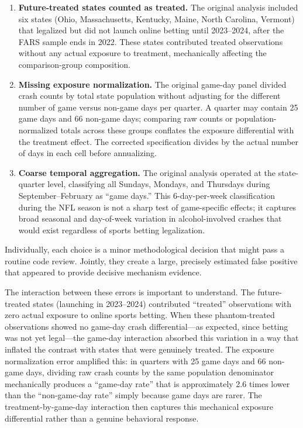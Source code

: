 \documentclass[12pt]{article}
\begin{document}
\begin{enumerate}
\item \textbf{Future-treated states counted as treated.} The original analysis included six states (Ohio, Massachusetts, Kentucky, Maine, North Carolina, Vermont) that legalized but did not launch online betting until 2023--2024, after the FARS sample ends in 2022. These states contributed treated observations without any actual exposure to treatment, mechanically affecting the comparison-group composition.

\item \textbf{Missing exposure normalization.} The original game-day panel divided crash counts by total state population without adjusting for the different number of game versus non-game days per quarter. A quarter may contain 25 game days and 66 non-game days; comparing raw counts or population-normalized totals across these groups conflates the exposure differential with the treatment effect. The corrected specification divides by the actual number of days in each cell before annualizing.

\item \textbf{Coarse temporal aggregation.} The original analysis operated at the state-quarter level, classifying all Sundays, Mondays, and Thursdays during September--February as ``game days.'' This 6-day-per-week classification during the NFL season is not a sharp test of game-specific effects; it captures broad seasonal and day-of-week variation in alcohol-involved crashes that would exist regardless of sports betting legalization.
\end{enumerate}

Individually, each choice is a minor methodological decision that might pass a routine code review. Jointly, they create a large, precisely estimated false positive that appeared to provide decisive mechanism evidence.

The interaction between these errors is important to understand. The future-treated states (launching in 2023--2024) contributed ``treated'' observations with zero actual exposure to online sports betting. When these phantom-treated observations showed no game-day crash differential---as expected, since betting was not yet legal---the game-day interaction absorbed this variation in a way that inflated the contrast with states that were genuinely treated. The exposure normalization error amplified this: in quarters with 25 game days and 66 non-game days, dividing raw crash counts by the same population denominator mechanically produces a ``game-day rate'' that is approximately 2.6 times lower than the ``non-game-day rate'' simply because game days are rarer. The treatment-by-game-day interaction then captures this mechanical exposure differential rather than a genuine behavioral response.
\end{document}
